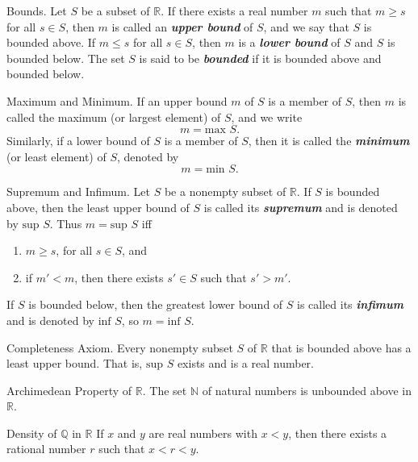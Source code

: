 \documentclass[12pt]{article}
\newcommand\Real{\mathbb{R}}
\newcommand\Natural{\mathbb{N}}
\newcommand\Rational{\mathbb{Q}}
\newcommand\pr{\ensuremath{'}}
\begin{document}
\begin{definition}{Bounds.}
  Let $S$ be a subset of $\Real$. If there exists a real number $m$ such that
  $m\ge s$ for all $s\in S$, then $m$ is called an \textit{\textbf{upper bound}}
  of $S$, and we say that $S$ is bounded above. If $m\le s$ for all $s\in S$,
  then $m$ is a \textit{\textbf{lower bound}} of $S$ and $S$ is bounded below.
  The set $S$ is said to be \textit{\textbf{bounded}} if it is bounded above and
  bounded below.
\end{definition}

\begin{definition}{Maximum and Minimum.}
  If an upper bound $m$ of $S$ is a member of $S$, then $m$ is called the
  maximum (or largest element) of $S$, and we write $$m=\text{max } S.$$
  Similarly, if a lower bound of $S$ is a member of $S$, then it is called
  the \textit{\textbf{minimum}} (or least element) of $S$, denoted by
  $$m=\text{min } S.$$
\end{definition}

\begin{definition}{Supremum and Infimum.}
  Let $S$ be a nonempty subset of $\Real$. If $S$ is bounded above, then the least
  upper bound of $S$ is called its \textit{\textbf{supremum}} and is denoted
  by $\text{sup } S$. Thus $m=\text{sup } S$ iff
  \begin{enumerate}
    \item $m \ge s$, for all $s \in S$, and 
    \item if $m\pr < m$, then there exists $s\pr \in S$ such that $s\pr > m\pr$.
  \end{enumerate}
  If $S$ is bounded below, then the greatest lower bound of $S$ is called its
  \textit{\textbf{infimum}} and is denoted by $\text{inf } S$, so
  $m=\text{inf } S$.
\end{definition}

\begin{definition}{Completeness Axiom.}
  Every nonempty subset $S$ of $\Real$ that is bounded above has a least upper
  bound. That is, $\text{sup } S$ exists and is a real number.
\end{definition}

\begin{definition}{Archimedean Property of $\Real$.}
  The set $\Natural$ of natural numbers is unbounded above in $\Real$.
\end{definition}

\begin{definition}{Density of $\Rational$ in $\Real$}
  If $x$ and $y$ are real numbers with $x < y$, then there exists a rational
  number $r$ such that $x < r < y$.
\end{definition}
\end{document}
